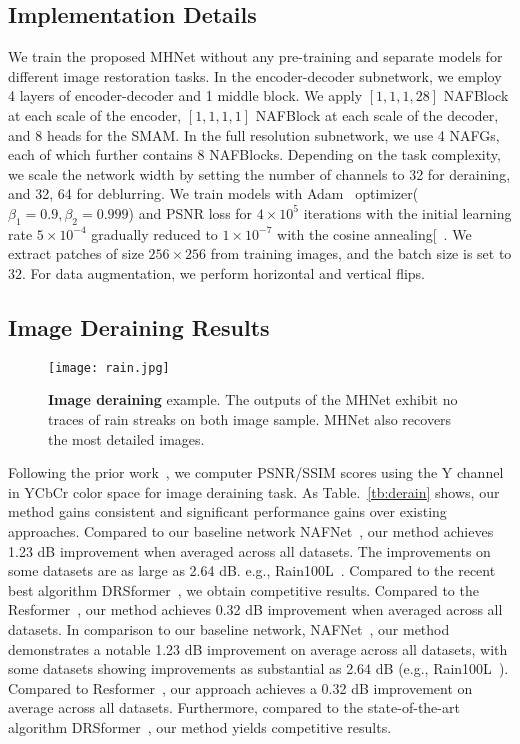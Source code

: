 \documentclass[lettersize,journal]{IEEEtran}
\begin{document}
\subsection{Implementation Details}
We train the proposed MHNet without any pre-training and separate models for different image restoration tasks. In the encoder-decoder subnetwork, we employ 4 layers of encoder-decoder and 1 middle block. We apply $[1, 1, 1, 28]$ NAFBlock at each scale of the encoder, $[1, 1, 1, 1]$ NAFBlock at each scale of the decoder, and 8 heads for the SMAM. In the full resolution subnetwork, we use 4 NAFGs, each of which further contains 8 NAFBlocks. Depending on the task complexity, we scale the network width by setting the number of channels to 32 for deraining, and 32, 64 for deblurring. We train models with Adam~\cite{2014Adam} optimizer($\beta_1=0.9, \beta_2=0.999$) and PSNR loss for $4 \times 10^5$ iterations with the initial learning rate $5 \times 10^{-4}$ gradually reduced to $1 \times 10^{-7}$  with the cosine annealing[~\cite{2016SGDR}. We extract patches of size $256 \times 256$ from training images, and the batch size is set to $32$. For data augmentation, we perform horizontal and vertical flips. 




\subsection{Image Deraining Results}
\begin{figure*}[!htb] \centerline{\texttt{[image: rain.jpg]}}
	\caption{\textbf{Image deraining} example. The outputs of the MHNet exhibit
no traces of rain streaks on both image sample. MHNet also recovers the most detailed images.}
	\label{fig:05}
\end{figure*}
Following the prior work~\cite{Zamir2021MPRNet,MSPFN,SPAIR}, we computer PSNR/SSIM scores using the Y channel in YCbCr color space for image deraining task. As Table.~\ref{tb:derain} shows, our method gains  consistent and significant performance gains over existing approaches. 
Compared to our baseline network NAFNet~\cite{chen2022simple}, our method achieves 1.23 dB improvement when averaged across all datasets. The improvements on some datasets are as large as 2.64 dB. e.g., Rain100L~\cite{Rain100}. Compared to the recent best algorithm DRSformer~\cite{DRSformer}, we obtain competitive results.  Compared to the Resformer~\cite{Zamir2021Restormer},  our method achieves 0.32 dB improvement when averaged across all datasets.
In comparison to our baseline network, NAFNet~\cite{chen2022simple}, our method demonstrates a notable 1.23 dB improvement on average across all datasets, with some datasets showing improvements as substantial as 2.64 dB (e.g., Rain100L~\cite{Rain100}). Compared to Resformer~\cite{Zamir2021Restormer}, our approach achieves a 0.32 dB improvement on average across all datasets. Furthermore, compared to the state-of-the-art algorithm DRSformer~\cite{DRSformer}, our method yields competitive results. 
\end{document}

